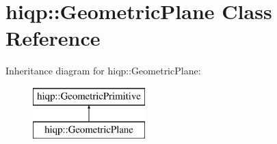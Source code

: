 \hypertarget{classhiqp_1_1GeometricPlane}{\section{hiqp\-:\-:Geometric\-Plane Class Reference}
\label{classhiqp_1_1GeometricPlane}
}
Inheritance diagram for hiqp\-:\-:Geometric\-Plane\-:\begin{figure}[H]
\begin{center}
\leavevmode
\includegraphics[height=2.000000cm]{classhiqp_1_1GeometricPlane}
\end{center}
\end{figure}
